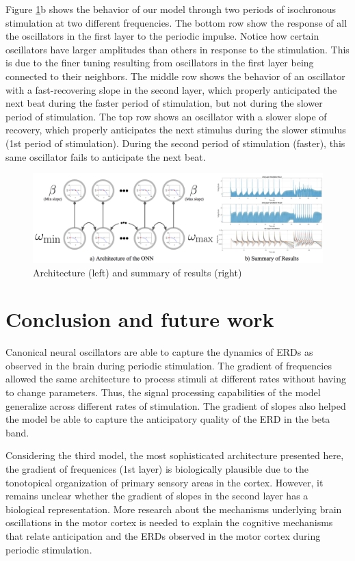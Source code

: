 \documentclass{article}
\begin{document}
Figure \ref{fig:arch3}b shows the behavior of our model through two periods of isochronous stimulation at two different frequencies. The bottom row show the response of all the oscillators in the first layer to the periodic impulse. Notice how certain oscillators have larger amplitudes than others in response to the stimulation. This is due to the finer tuning resulting from oscillators in the first layer being connected to their neighbors. The middle row shows the behavior of an oscillator with a fast-recovering slope in the second layer, which properly anticipated the next beat during the faster period of stimulation, but not during the slower period of stimulation. The top row shows an oscillator with a slower slope of recovery, which properly anticipates the next stimulus during the slower stimulus (1st period of stimulation). During the second period of stimulation (faster), this same oscillator fails to anticipate the next beat.
\begin{figure}
  \centering
  \includegraphics[scale=0.33]{arch3.png}
  \caption{Architecture (left) and summary of results (right)}
  \label{fig:arch3}
\end{figure}

\section{Conclusion and future work}

Canonical neural oscillators are able to capture the dynamics of ERDs as observed in the brain during periodic stimulation. The gradient of frequencies allowed the same architecture to process stimuli at different rates without having to change parameters. Thus, the signal processing capabilities of the model generalize across different rates of stimulation. The gradient of slopes also helped the model be able to capture the anticipatory quality of the ERD in the beta band. 

Considering the third model, the most sophisticated architecture presented here, the gradient of frequenices (1st layer) is biologically plausible due to the tonotopical organization of primary sensory areas in the cortex. However, it remains unclear whether the gradient of slopes in the second layer has a biological representation. More research about the mechanisms underlying brain oscillations in the motor cortex is needed to explain the cognitive mechanisms that relate anticipation and the ERDs observed in the motor cortex during periodic stimulation.
\end{document}
